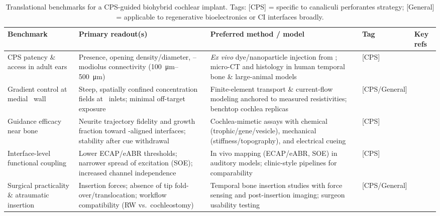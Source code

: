 \begin{table*}[t]
	\caption{Translational benchmarks for a CPS-guided biohybrid cochlear implant. Tags: [CPS] = specific to canaliculi perforantes strategy; [General] = applicable to regenerative bioelectronics or CI interfaces broadly.}
	\label{tab:benchmarks}
	\centering
	\renewcommand{\arraystretch}{1.2}
	\begin{tabular}{p{} p{} p{} p{} p{}}
		\hline
		\textbf{Benchmark} & \textbf{Primary readout(s)} & \textbf{Preferred method / model} & \textbf{Tag} & \textbf{Key refs} \\
		\hline
		CPS patency \& access in adult ears &
		Presence, opening density/diameter, \CPS--modiolus connectivity (\SIrange{100}{500}{\micro\meter}) &
		\emph{Ex vivo} dye/nanoparticle injection from \ST; micro-CT and histology in human temporal bone \& large-animal models &
		[CPS] &
		\cite{raskandersen2006, sando1971, masuda1971, lim1970} \\
		
		Gradient control at medial \ST\ wall &
		Steep, spatially confined concentration fields at \CPS\ inlets; minimal off-target exposure &
		Finite-element transport \& current-flow modeling anchored to measured resistivities; benchtop cochlea replicas &
		[CPS/General] &
		\cite{Micco2006, nella2023} \\
		
		Guidance efficacy near bone &
		Neurite trajectory fidelity and growth fraction toward \CPS-aligned interfaces; stability after cue withdrawal &
		Cochlea-mimetic assays with chemical (trophic/gene/vesicle), mechanical (stiffness/topography), and electrical cueing &
		[CPS] &
		\cite{Kempfle2021, StPeter2022, Chang2020, Scheper2019, tan2012, CarnicerLombarte2024AdvMat} \\
		
		Interface-level functional coupling &
		Lower ECAP/eABR thresholds; narrower spread of excitation (SOE); increased channel independence &
		In vivo mapping (ECAP/eABR, SOE) in auditory models; clinic-style pipelines for comparability &
		[CPS] &
		\cite{wilson2008, wilson2014, Micco2006, Rebscher2008} \\
		
		Surgical practicality \& atraumatic insertion &
		Insertion forces; absence of tip fold-over/translocation; workflow compatibility (RW vs.\ cochleostomy) &
		Temporal bone insertion studies with force sensing and post-insertion imaging; surgeon usability testing &
		[CPS/General] &
		\cite{Rebscher2008, Sheykholeslami2002} \\
		

\end{tabular}
\end{table*}
